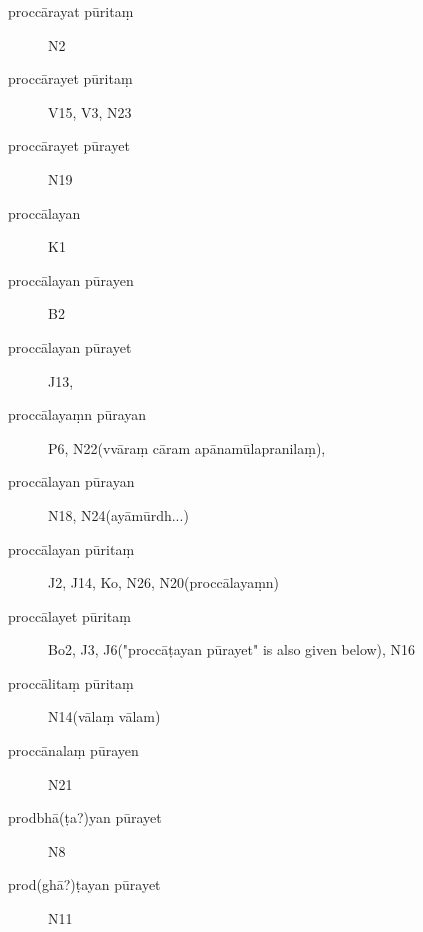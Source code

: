 \begin{ekdosis}
\begin{marma}[hp01_048]
\begin{description}
\item[proccārayat pūritaṃ]        N2
\item[proccārayet pūritaṃ]        V15, V3, N23
\item[proccārayet pūrayet]        N19
\item[proccālayan]        K1
\item[proccālayan pūrayen]        B2
\item[proccālayan pūrayet]        J13,
\item[proccālayaṃn pūrayan]        P6, N22(vvāraṃ cāram apānamūlapranilaṃ), \item[proccālayan pūrayan]        N18, N24(ayāmūrdh...)
\item[proccālayan pūritaṃ]        J2, J14, Ko, N26, N20(proccālayaṃn)
\item[proccālayet pūritaṃ]        Bo2, J3, J6("proccāṭayan pūrayet" is also given below), N16
\item[proccālitaṃ pūritaṃ]        N14(vālaṃ vālam)
\item[proccānalaṃ pūrayen]        N21
\item[prodbhā(ṭa?)yan pūrayet]        N8
\item[prod(ghā?)ṭayan pūrayet]        N11



\end{description}
\end{marma}
\end{ekdosis}
